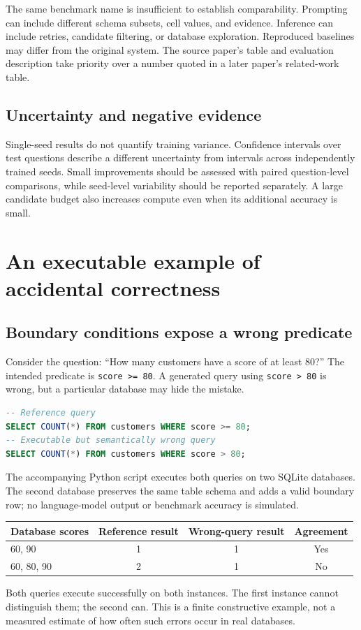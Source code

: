 \documentclass[11pt,a4paper]{article}
\begin{document}
The same benchmark name is insufficient to establish comparability. Prompting can include different schema subsets, cell values, and evidence. Inference can include retries, candidate filtering, or database exploration. Reproduced baselines may differ from the original system. The source paper's table and evaluation description take priority over a number quoted in a later paper's related-work table.

\subsection{Uncertainty and negative evidence}
Single-seed results do not quantify training variance. Confidence intervals over test questions describe a different uncertainty from intervals across independently trained seeds. Small improvements should be assessed with paired question-level comparisons, while seed-level variability should be reported separately. A large candidate budget also increases compute even when its additional accuracy is small.

\clearpage
\section{An executable example of accidental correctness}
\subsection{Boundary conditions expose a wrong predicate}
Consider the question: ``How many customers have a score of at least 80?'' The intended predicate is \texttt{score >= 80}. A generated query using \texttt{score > 80} is wrong, but a particular database may hide the mistake.
\begin{lstlisting}[language=SQL]
-- Reference query
SELECT COUNT(*) FROM customers WHERE score >= 80;
-- Executable but semantically wrong query
SELECT COUNT(*) FROM customers WHERE score > 80;
\end{lstlisting}
The accompanying Python script executes both queries on two SQLite databases. The second database preserves the same table schema and adds a valid boundary row; no language-model output or benchmark accuracy is simulated.

\begin{center}
\begin{tabular}{@{}lccc@{}}
\toprule
Database scores & Reference result & Wrong-query result & Agreement\\
\midrule
60, 90 & 1 & 1 & Yes\\
60, 80, 90 & 2 & 1 & No\\
\bottomrule
\end{tabular}
\end{center}
Both queries execute successfully on both instances. The first instance cannot distinguish them; the second can. This is a finite constructive example, not a measured estimate of how often such errors occur in real databases.
\end{document}
